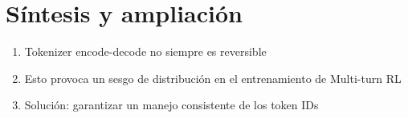 \section{Síntesis y ampliación}
\begin{enumerate}
  \item Tokenizer encode-decode no siempre es reversible
  \item Esto provoca un sesgo de distribución en el entrenamiento de Multi-turn RL
  \item Solución: garantizar un manejo consistente de los token IDs
\end{enumerate}


